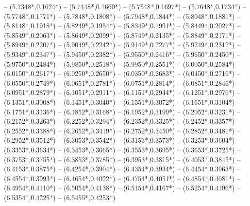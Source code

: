 {	-- ({5.7348*\dx},{0.1624*\dy})
	-- ({5.7448*\dx},{0.1660*\dy})
	-- ({5.7548*\dx},{0.1697*\dy})
	-- ({5.7648*\dx},{0.1734*\dy})
	-- ({5.7748*\dx},{0.1771*\dy})
	-- ({5.7848*\dx},{0.1808*\dy})
	-- ({5.7948*\dx},{0.1844*\dy})
	-- ({5.8048*\dx},{0.1881*\dy})
	-- ({5.8148*\dx},{0.1918*\dy})
	-- ({5.8249*\dx},{0.1954*\dy})
	-- ({5.8349*\dx},{0.1991*\dy})
	-- ({5.8449*\dx},{0.2027*\dy})
	-- ({5.8549*\dx},{0.2063*\dy})
	-- ({5.8649*\dx},{0.2099*\dy})
	-- ({5.8749*\dx},{0.2135*\dy})
	-- ({5.8849*\dx},{0.2171*\dy})
	-- ({5.8949*\dx},{0.2207*\dy})
	-- ({5.9049*\dx},{0.2242*\dy})
	-- ({5.9149*\dx},{0.2277*\dy})
	-- ({5.9249*\dx},{0.2312*\dy})
	-- ({5.9349*\dx},{0.2347*\dy})
	-- ({5.9450*\dx},{0.2382*\dy})
	-- ({5.9550*\dx},{0.2416*\dy})
	-- ({5.9650*\dx},{0.2450*\dy})
	-- ({5.9750*\dx},{0.2484*\dy})
	-- ({5.9850*\dx},{0.2518*\dy})
	-- ({5.9950*\dx},{0.2551*\dy})
	-- ({6.0050*\dx},{0.2584*\dy})
	-- ({6.0150*\dx},{0.2617*\dy})
	-- ({6.0250*\dx},{0.2650*\dy})
	-- ({6.0350*\dx},{0.2683*\dy})
	-- ({6.0450*\dx},{0.2716*\dy})
	-- ({6.0550*\dx},{0.2749*\dy})
	-- ({6.0651*\dx},{0.2781*\dy})
	-- ({6.0751*\dx},{0.2814*\dy})
	-- ({6.0851*\dx},{0.2846*\dy})
	-- ({6.0951*\dx},{0.2879*\dy})
	-- ({6.1051*\dx},{0.2911*\dy})
	-- ({6.1151*\dx},{0.2944*\dy})
	-- ({6.1251*\dx},{0.2976*\dy})
	-- ({6.1351*\dx},{0.3008*\dy})
	-- ({6.1451*\dx},{0.3040*\dy})
	-- ({6.1551*\dx},{0.3072*\dy})
	-- ({6.1651*\dx},{0.3104*\dy})
	-- ({6.1751*\dx},{0.3136*\dy})
	-- ({6.1852*\dx},{0.3168*\dy})
	-- ({6.1952*\dx},{0.3199*\dy})
	-- ({6.2052*\dx},{0.3231*\dy})
	-- ({6.2152*\dx},{0.3263*\dy})
	-- ({6.2252*\dx},{0.3294*\dy})
	-- ({6.2352*\dx},{0.3325*\dy})
	-- ({6.2452*\dx},{0.3357*\dy})
	-- ({6.2552*\dx},{0.3388*\dy})
	-- ({6.2652*\dx},{0.3419*\dy})
	-- ({6.2752*\dx},{0.3450*\dy})
	-- ({6.2852*\dx},{0.3481*\dy})
	-- ({6.2952*\dx},{0.3512*\dy})
	-- ({6.3053*\dx},{0.3542*\dy})
	-- ({6.3153*\dx},{0.3573*\dy})
	-- ({6.3253*\dx},{0.3604*\dy})
	-- ({6.3353*\dx},{0.3634*\dy})
	-- ({6.3453*\dx},{0.3665*\dy})
	-- ({6.3553*\dx},{0.3695*\dy})
	-- ({6.3653*\dx},{0.3725*\dy})
	-- ({6.3753*\dx},{0.3755*\dy})
	-- ({6.3853*\dx},{0.3785*\dy})
	-- ({6.3953*\dx},{0.3815*\dy})
	-- ({6.4053*\dx},{0.3845*\dy})
	-- ({6.4153*\dx},{0.3875*\dy})
	-- ({6.4254*\dx},{0.3904*\dy})
	-- ({6.4354*\dx},{0.3934*\dy})
	-- ({6.4454*\dx},{0.3963*\dy})
	-- ({6.4554*\dx},{0.3993*\dy})
	-- ({6.4654*\dx},{0.4022*\dy})
	-- ({6.4754*\dx},{0.4051*\dy})
	-- ({6.4854*\dx},{0.4081*\dy})
	-- ({6.4954*\dx},{0.4110*\dy})
	-- ({6.5054*\dx},{0.4138*\dy})
	-- ({6.5154*\dx},{0.4167*\dy})
	-- ({6.5254*\dx},{0.4196*\dy})
	-- ({6.5354*\dx},{0.4225*\dy})
	-- ({6.5455*\dx},{0.4253*\dy})
}
